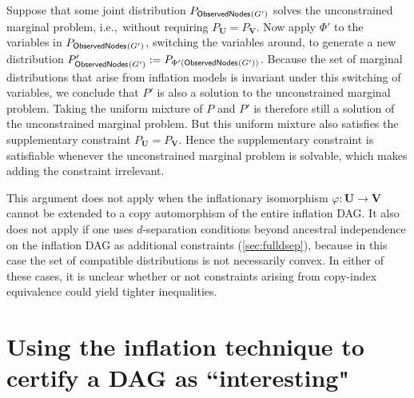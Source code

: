 \documentclass[aps,english,10pt,superscriptaddress,onecolumn,twoside,longbibliography,pra,floatfix,fleqn,nofootinbib]{revtex4-1}%
\theoremstyle{definition}
\newcommand{\SmallNamedFunction}[3][]{\operatorname{\mathsf{#2}}_{#1}\parenths{#3}}
\newcommand{\obsnodes}[1]{\SmallNamedFunction{ObservedNodes}{#1}}
\DeclarePairedDelimiter{\parenths}{\lparen}{\rparen}
\begin{document}
Suppose that some joint distribution $P_{\obsnodes{G'}}$ solves the unconstrained marginal problem, i.e.,~without requiring $P_{\bm{U}} = P_{\bm{V}}$. Now apply $\Phi'$ to the variables in $P_{\obsnodes{G'}}$, switching the variables around, to generate a new distribution $P'_{\obsnodes{G'}}:=P_{\Phi'(\obsnodes{G'})}$. Because the set of marginal distributions that arise from inflation models is invariant under this switching of variables, we conclude that $P'$ is also a solution to the unconstrained marginal problem. Taking the uniform mixture of $P$ and $P'$ is therefore still a solution of the unconstrained marginal problem. But this uniform mixture also satisfies the supplementary constraint $P_{\bm{U}} = P_{\bm{V}}$. Hence the supplementary constraint is satisfiable whenever the unconstrained marginal problem is solvable, which makes adding the constraint irrelevant.

This argument does not apply when the inflationary isomorphism $\varphi:\bm{U}\to\bm{V}$ cannot be extended to a copy automorphism of the entire inflation DAG. It also does not apply if one uses $d$-separation conditions beyond ancestral independence on the inflation DAG as additional constraints (\cref{sec:fulldsep}), because in this case the set of compatible distributions is not necessarily convex.  In either of these cases, it is unclear whether or not constraints arising from copy-index equivalence could yield tighter inequalities. 



\section{Using the inflation technique to certify a DAG as ``interesting"\label{sec:interestingproof}}
\end{document}
